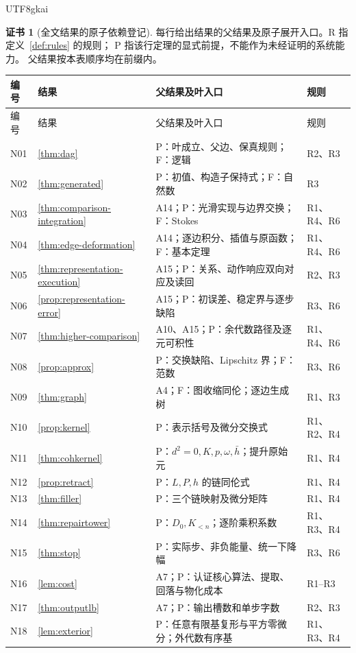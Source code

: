 \documentclass[12pt]{report}
\theoremstyle{definition}
\newtheorem{Certificate}{证书}[chapter]
\begin{document}
\begin{CJK*}{UTF8}{gkai}
\begin{Certificate}[全文结果的原子依赖登记]
每行给出结果的父结果及原子展开入口。R 指定义~\ref{def:rules} 的规则；
P 指该行定理的显式前提，不能作为未经证明的系统能力。
父结果按本表顺序均在前缀内。
\small
\begin{longtable}{p{}p{}p{}p{}}
\toprule 编号 & 结果 & 父结果及叶入口 & 规则\\\midrule
\endfirsthead
\toprule 编号 & 结果 & 父结果及叶入口 & 规则\\\midrule
\endhead
N01 & \ref{thm:dag} & P：叶成立、父边、保真规则；F：逻辑 & R2、R3\\
N02 & \ref{thm:generated} & P：初值、构造子保持式；F：自然数 & R3\\
N03 & \ref{thm:comparison-integration} & A14；P：光滑实现与边界交换；F：Stokes & R1、R4、R6\\
N04 & \ref{thm:edge-deformation} & A14；逐边积分、插值与原函数；F：基本定理 & R1、R4、R6\\
N05 & \ref{thm:representation-execution} & A15；P：关系、动作响应双向对应及读回 & R2、R3\\
N06 & \ref{prop:representation-error} & A15；P：初误差、稳定界与逐步缺陷 & R3、R6\\
N07 & \ref{thm:higher-comparison} & A10、A15；P：余代数路径及逐元可积性 & R1、R4、R6\\
N08 & \ref{prop:approx} & P：交换缺陷、Lipschitz 界；F：范数 & R3、R6\\
N09 & \ref{thm:graph} & A4；F：图收缩同伦；逐边生成树 & R1、R3\\
N10 & \ref{prop:kernel} & P：表示括号及微分交换式 & R1、R2、R4\\
N11 & \ref{thm:cohkernel} & P：\(d^2=0,K,p,\omega,\bar h\)；提升原始元 & R1、R4\\
N12 & \ref{prop:retract} & P：\(L,P,h\) 的链同伦式 & R1、R4\\
N13 & \ref{thm:filler} & P：三个链映射及微分矩阵 & R1、R4\\
N14 & \ref{thm:repairtower} & P：\(D_0,K_{<n}\)；逐阶乘积系数 & R1、R3、R4\\
N15 & \ref{thm:stop} & P：实际步、非负能量、统一下降幅 & R3、R6\\
N16 & \ref{lem:cost} & A7；P：认证核心算法、提取、回落与物化成本 & R1--R3\\
N17 & \ref{thm:outputlb} & A7；P：输出槽数和单步字数 & R2、R3\\
N18 & \ref{lem:exterior} & P：任意有限基复形与平方零微分；外代数有序基 & R1、R3、R4\\

\end{longtable}
\end{Certificate}
\end{CJK*}
\end{document}
